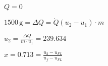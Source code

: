 \( Q = 0 \)  

\( 1500 \, \text{g} = \Delta Q = \dot{Q} (u_2 - u_1) \cdot m \)  

\( u_2 = \frac{\Delta Q}{m \cdot u_1} = 239.634 \)  

\( x = 0.713 = \frac{u_2 - u_{FL}}{u_f - u_{FL}} \)